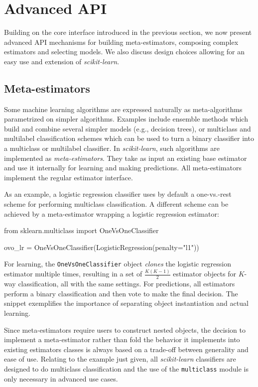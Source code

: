 \documentclass{llncs}
\newcommand{\sklearn}{\textit{scikit-learn}\xspace}
\begin{document}
\section{Advanced API}

\label{sec:advanced-api}

Building on the core interface introduced in the previous section, we now
present advanced API mechanisms for building meta-estimators,
composing complex estimators and selecting models. We also discuss design
choices allowing for an easy use and extension of \sklearn.

\subsection{Meta-estimators}

Some machine learning algorithms are expressed naturally
as meta-algorithms parametrized on simpler algorithms.
Examples include ensemble methods which
build and combine several simpler models (e.g., decision trees), or multiclass
and multilabel classification schemes which can be used to turn a binary
classifier into a multiclass or multilabel classifier. In \sklearn, such algorithms are
implemented as \textit{meta-estimators}. They take as input an existing base
estimator and use it internally for learning and making predictions.
All meta-estimators implement the regular estimator interface.

As an example, a logistic regression classifier
uses by default a one-vs.-rest scheme
for performing multiclass classification.
A different scheme can be achieved
by a meta-estimator wrapping a logistic regression estimator:
\begin{pythoncode}
from sklearn.multiclass import OneVsOneClassifier

ovo_lr = OneVsOneClassifier(LogisticRegression(penalty="l1"))
\end{pythoncode}
For learning, the \texttt{OneVsOneClassifier} object
\textit{clones} the logistic regression estimator multiple times,
resulting in a set of $\frac{K(K-1)}{2}$ estimator objects
for $K$-way classification,
all with the same settings.
For predictions, all estimators perform a binary classification and then vote to make the final decision.
The snippet exemplifies the importance
of separating object instantiation and actual learning.

Since meta-estimators require users to construct nested objects,
the decision to implement a meta-estimator
rather than fold the behavior it implements
into existing estimators classes
is always based on a trade-off between generality and ease of use.
Relating to the example just given,
all \sklearn classifiers are designed to do multiclass classification
and the use of the \texttt{multiclass} module
is only necessary in advanced use cases.
\end{document}
